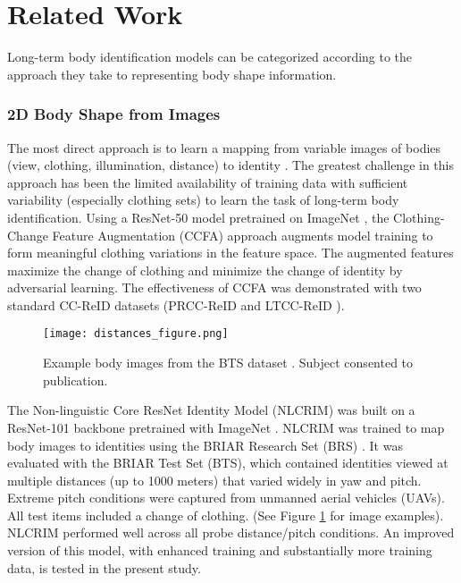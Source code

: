 \section{Related Work}
Long-term body identification models  can be categorized according to the approach they take 
to representing body shape information.

\subsubsection{2D Body Shape from Images}
The most direct approach is to learn
a mapping from variable images of bodies
(view, clothing, illumination, distance) to identity
\cite{han2023clothing,myers2023recognizing}.
The greatest challenge in this approach has been
the limited availability of training data with sufficient
variability (especially clothing sets) to learn the task
of long-term body identification.
Using a ResNet-50 model pretrained on ImageNet \cite{russakovsky2015imagenet}, the Clothing-Change Feature Augmentation (CCFA) approach  \cite{han2023clothing} augments
model training to form meaningful clothing variations in the feature
space. The augmented features maximize
the change of clothing and minimize the change of identity
by adversarial learning.
The effectiveness of CCFA was demonstrated with 
two standard CC-ReID datasets (PRCC-ReID \cite{yang2019person} and  LTCC-ReID \cite{qian2020long}).

   \begin{figure}[thpb]
      \centering
      \texttt{[image: distances\_figure.png]}
      \caption{Example body images from the BTS dataset \cite{cornett2023expanding}. Subject consented to publication. }
      \label{BRIAR_images}
      \vskip -0.25cm
   \end{figure}

 The Non-linguistic Core ResNet Identity Model (NLCRIM) \cite{myers2023recognizing} was built on a ResNet-101 backbone pretrained with ImageNet \cite{russakovsky2015imagenet}.  NLCRIM was 
trained to map body images to identities using the BRIAR Research Set (BRS) 
 \cite{cornett2023expanding}. It was  
evaluated with the BRIAR Test Set (BTS), which contained
identities viewed at multiple distances (up to 1000 meters)
that varied widely in yaw and pitch. Extreme pitch conditions
were captured from unmanned aerial vehicles (UAVs). All
test items included a change of clothing.
(See Figure \ref{BRIAR_images} for image examples). 
NLCRIM performed well
across all probe distance/pitch conditions. 
An improved version
of this model, with enhanced training 
and  substantially more training data, is tested in the present
study.

